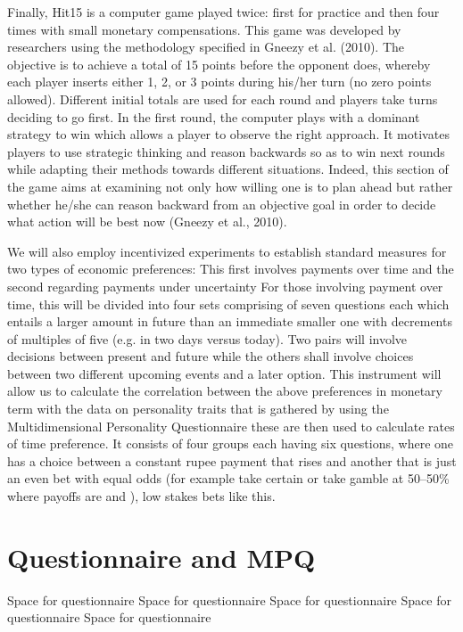 \documentclass[12pt,a4paper]{article}
\begin{document}
{Finally, Hit15 is a computer game played twice: first for practice and then four times with small monetary compensations. This game was developed by researchers using the methodology specified in Gneezy et al. (2010)\cite{gneezy2010experience}. The objective is to achieve a total of 15 points before the opponent does, whereby each player inserts either 1, 2, or 3 points during his/her turn (no zero points allowed). Different initial totals are used for each round and players take turns deciding to go first. In the first round, the computer plays with a dominant strategy to win which allows a player to observe the right approach. It motivates players to use strategic thinking and reason backwards so as to win next rounds while adapting their methods towards different situations. Indeed, this section of the game aims at examining not only how willing one is to plan ahead but rather whether he/she can reason backward from an objective goal in order to decide what action will be best now (Gneezy et al., 2010).

We will also employ incentivized experiments to establish standard measures for two types of economic preferences: This first involves payments over time and the second regarding payments under uncertainty For those involving payment over time, this will be divided into four sets comprising of seven questions each which entails a larger amount in future than an immediate smaller one with decrements of multiples of five (e.g.  in two days versus  today). Two pairs will involve decisions between present and future while the others shall involve choices between two different upcoming events and a later option. This instrument will allow us to calculate the correlation between the above preferences in monetary term with the data on personality traits that is gathered by using the Multidimensional Personality Questionnaire these are then used to calculate rates of time preference. It consists of four groups each having six questions, where one has a choice between a constant rupee payment that rises and another that is just an even bet with equal odds (for example take certain  or take gamble at 50–50\% where payoffs are  and ), low stakes bets like this.\\
\newpage 
\section{Questionnaire and MPQ}
Space for questionnaire
\newpage
Space for questionnaire
\newpage
Space for questionnaire
\newpage
Space for questionnaire
\newpage
Space for questionnaire
\newpage
}
\end{document}
